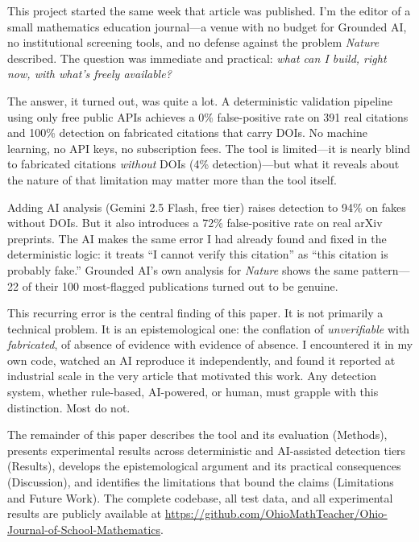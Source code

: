 This project started the same week that article was published. I'm the editor of a small mathematics education journal---a venue with no budget for Grounded AI, no institutional screening tools, and no defense against the problem \textit{Nature} described. The question was immediate and practical: \emph{what can I build, right now, with what's freely available?}

The answer, it turned out, was quite a lot. A deterministic validation pipeline using only free public APIs achieves a 0\% false-positive rate on 391 real citations and 100\% detection on fabricated citations that carry DOIs. No machine learning, no API keys, no subscription fees. The tool is limited---it is nearly blind to fabricated citations \emph{without} DOIs (4\% detection)---but what it reveals about the nature of that limitation may matter more than the tool itself.

Adding AI analysis (Gemini 2.5 Flash, free tier) raises detection to 94\% on fakes without DOIs. But it also introduces a 72\% false-positive rate on real arXiv preprints. The AI makes the same error I had already found and fixed in the deterministic logic: it treats ``I cannot verify this citation'' as ``this citation is probably fake.'' Grounded AI's own analysis for \textit{Nature} shows the same pattern---22 of their 100 most-flagged publications turned out to be genuine.

This recurring error is the central finding of this paper. It is not primarily a technical problem. It is an epistemological one: the conflation of \emph{unverifiable} with \emph{fabricated}, of absence of evidence with evidence of absence. I encountered it in my own code, watched an AI reproduce it independently, and found it reported at industrial scale in the very article that motivated this work. Any detection system, whether rule-based, AI-powered, or human, must grapple with this distinction. Most do not.

The remainder of this paper describes the tool and its evaluation (Methods), presents experimental results across deterministic and AI-assisted detection tiers (Results), develops the epistemological argument and its practical consequences (Discussion), and identifies the limitations that bound the claims (Limitations and Future Work). The complete codebase, all test data, and all experimental results are publicly available at \url{https://github.com/OhioMathTeacher/Ohio-Journal-of-School-Mathematics}.
